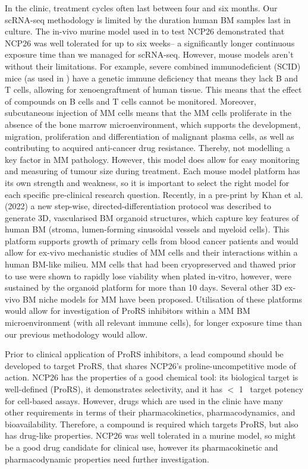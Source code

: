 In the clinic, treatment cycles often last between four and six months.
Our scRNA-seq methodology is limited by the duration human BM samples last in culture.
The in-vivo murine model used in \cite{bottpreclinical2022} to test NCP26 demonstrated that NCP26 was well tolerated for up to six weeks-- a significantly longer continuous exposure time than we managed for scRNA-seq.
However, mouse models aren't without their limitations.
For example, severe combined immunodeficient (SCID) mice (as used in \cite{bottpreclinical2022}) have a genetic immune deficiency that means they lack B and T cells, allowing for xenoengraftment of human tissue.
This means that the effect of compounds on B cells and T cells cannot be monitored.
Moreover, subcutaneous injection of MM cells means that the MM cells proliferate in the absence of the bone marrow microenvironment\cite{rossi2018mouse}, which supports the development, migration, proliferation and differentiation of malignant plasma cells, as well as contributing to acquired anti-cancer drug resistance.
Thereby, not modelling a key factor in MM pathology.
However, this model does allow for easy monitoring and measuring of tumour size during treatment.
Each mouse model platform has its own strength and weakness, so it is important to select the right model for each specific pre-clinical research question.
Recently, in a pre-print by Khan et al. (2022) a new step-wise, directed-differentiation protocol was described to generate 3D, vascularised BM organoid structures, which capture key features of human BM (stroma, lumen-forming sinusoidal vessels and myeloid cells)\cite{khan2022human}.
This platform supports growth of primary cells from blood cancer patients and would allow for ex-vivo mechanistic studies of MM cells and their interactions within a human BM-like milieu\cite{khan2022human}.
MM cells that had been cryopreserved and thawed prior to use were shown to rapidly lose viability when plated in-vitro, however, were sustained by the organoid platform for more than 10 days\cite{khan2022human}.
Several other 3D ex-vivo BM niche models for MM have been proposed\cite{jakubikova2016novel,ferrarini20173d}.
Utilisation of these platforms would allow for investigation of ProRS inhibitors within a MM BM microenvironment (with all relevant immune cells), for longer exposure time than our previous methodology would allow.

Prior to clinical application of ProRS inhibitors, a lead compound should be developed to target ProRS, that shares NCP26's proline-uncompetitive mode of action.
NCP26 has the properties of a good chemical tool: its biological target is well-defined (ProRS), it demonstrates selectivity, and it has $<$ 1\si{\micro\Molar} target potency for cell-based assays.
However, drugs which are used in the clinic have many other requirements in terms of their pharmacokinetics, pharmacodynamics, and bioavailability.
Therefore, a compound is required which targets ProRS, but also has drug-like properties.
NCP26 was well tolerated in a murine model, so might be a good drug candidate for clinical use, however its pharmacokinetic and pharmacodynamic properties need further investigation.

